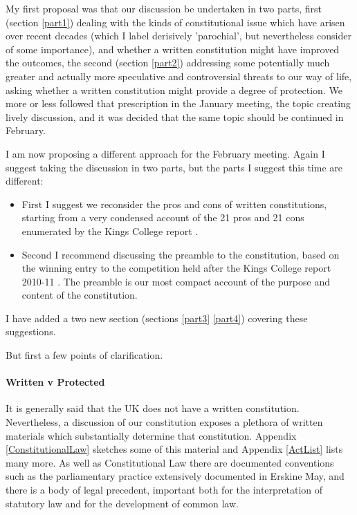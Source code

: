\documentclass[14pt,titlepage]{extarticle}
\begin{document}
My first proposal was that our discussion be undertaken in two parts, first (section \ref{part1}) dealing with the kinds of constitutional issue which have arisen over recent decades (which I label derisively 'parochial', but nevertheless consider of some importance), and whether a written constitution might have improved the outcomes, the second (section \ref{part2}) addressing some potentially much greater and actually more speculative and controversial threats to our way of life, asking whether a written constitution might provide a degree of protection.
We more or less followed that prescription in the January meeting, the topic creating lively discussion, and it was decided that the same topic should be continued in February.

I am now proposing a different approach for the February meeting.
Again I suggest taking the discussion in two parts, but the parts I suggest this time are different:
\begin{itemize}
\item
    First I suggest we reconsider the pros and cons of written constitutions, starting from a very condensed account of the 21 pros and 21 cons enumerated by the Kings College report \cite{rbjw003}.
\item
  Second I recommend discussing the preamble to the constitution, based on the winning entry to the competition held after the Kings College report 2010-11 \cite{rbjw011}.
  The preamble is our most compact account of the purpose and content of the constitution.

\end{itemize}

I have added a two new section (sections \ref{part3} \ref{part4}) covering these suggestions.


But first a few points of clarification.

\paragraph{Written v Protected}

It is generally said that the UK does not have a written constitution.
Nevertheless, a discussion of our constitution exposes a plethora of written materials which substantially determine that constitution.
Appendix \ref{ConstitutionalLaw} sketches some of this material and Appendix \ref{ActList} lists many more.
As well as Constitutional Law there are documented conventions such as the parliamentary practice extensively documented in Erskine May, and there is a body of legal precedent, important both for the interpretation of statutory law and for the development of common law.
\end{document}
